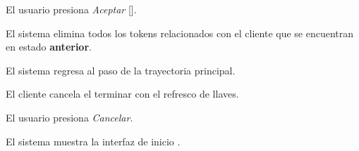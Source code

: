 {\begin{trayectoriaAlternativa}
    \item El usuario presiona \textit{Aceptar}
      [].

    \item El sistema elimina todos los tokens relacionados con el cliente que se
      encuentran en estado \textbf{anterior}.

    \item El sistema regresa al paso  de la trayectoria
      principal.

  \end{trayectoriaAlternativa}

  \begin{trayectoriaAlternativa}
    {El cliente cancela el terminar con el refresco de llaves.}

    \item El usuario presiona \textit{Cancelar}.

    \item El sistema muestra la interfaz de inicio
      .

  \end{trayectoriaAlternativa}
}
